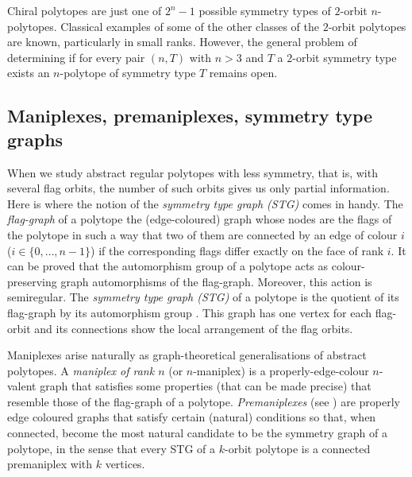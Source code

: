 \documentclass[a4paper,12pt,english]{article}
\begin{document}
Chiral polytopes are just one of $2^{n}-1$ possible symmetry types of $2$-orbit $n$-polytopes.
Classical examples of some of the other classes of the $2$-orbit polytopes are known, particularly in small ranks.
However, the general problem of determining if for every pair $(n,T)$ with $n>3$ and $T$ a $2$-orbit symmetry type exists an $n$-polytope of symmetry type $T$ remains open.

\subsection*{Maniplexes, premaniplexes, symmetry type graphs}

When we study abstract regular polytopes with less symmetry, that is, with several flag orbits, the number of such orbits gives us only partial information. 
Here is where the notion of the \emph{symmetry type graph (STG)} comes in handy. 
The \emph{flag-graph} of a polytope the (edge-coloured) graph whose nodes are the flags of the polytope in such a way that two of them are connected by an edge of colour $i$ ($i \in \{0, \dots, n-1\}$) if the corresponding flags differ exactly on the face of rank $i$.
It can be proved that the automorphism group of a polytope acts as colour-preserving graph automorphisms of the flag-graph. 
Moreover, this action is semiregular.
The \emph{symmetry type graph (STG)} of a polytope is the quotient of its flag-graph by its automorphism group
\cite{CunDelHuTo2015_SymmetryTypeGraphs}.
This graph has one vertex for each flag-orbit and its connections show the local arrangement of the flag orbits. 

Maniplexes arise naturally as graph-theoretical generalisations of abstract polytopes. 
A \emph{maniplex of rank $n$} (or $n$-maniplex) is a properly-edge-colour $n$-valent graph that satisfies some properties (that can be made precise) that resemble those of the flag-graph of a polytope.
\emph{Premaniplexes} (see \cite{HubaMocMon2023_VoltageOperationsManiplexes,HubarMocha2023_AllPolytopesAre}) are properly edge coloured graphs that satisfy certain (natural) conditions so that, when connected, become the most natural candidate to be the symmetry graph of a polytope, in the sense that every STG of a $k$-orbit polytope is a connected premaniplex with $k$ vertices.

\end{document}
